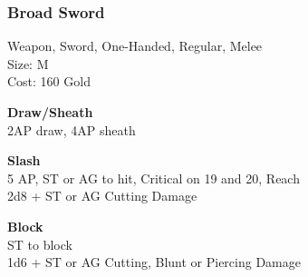 \subsubsection{Broad Sword}\label{weapon:broadSword}
Weapon, Sword, One-Handed, Regular, Melee\\
Size: M\\
Cost: 160 Gold

\textbf{Draw/Sheath}\\
2AP draw, 4AP sheath

\textbf{Slash}\\
5 AP, ST or AG to hit, Critical on 19 and 20,  Reach\\
2d8 + \texttimes ST or AG Cutting Damage

\textbf{Block}\\
ST to block\\
1d6 + \texttimes ST or AG Cutting, Blunt or Piercing Damage

